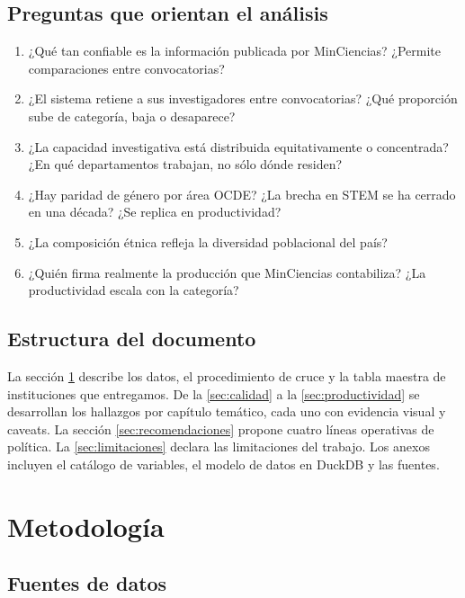 \documentclass[11pt,a4paper,oneside]{article}
\begin{document}
\subsection{Preguntas que orientan el análisis}

\begin{enumerate}[label=Q\arabic*., leftmargin=*]
\item ¿Qué tan confiable es la información publicada por MinCiencias? ¿Permite comparaciones entre convocatorias?
\item ¿El sistema retiene a sus investigadores entre convocatorias? ¿Qué proporción sube de categoría, baja o desaparece?
\item ¿La capacidad investigativa está distribuida equitativamente o concentrada? ¿En qué departamentos trabajan, no sólo dónde residen?
\item ¿Hay paridad de género por área OCDE? ¿La brecha en STEM se ha cerrado en una década? ¿Se replica en productividad?
\item ¿La composición étnica refleja la diversidad poblacional del país?
\item ¿Quién firma realmente la producción que MinCiencias contabiliza? ¿La productividad escala con la categoría?
\end{enumerate}

\subsection{Estructura del documento}

La sección \ref{sec:metodo} describe los datos, el procedimiento de cruce y la tabla maestra de instituciones que entregamos. De la \ref{sec:calidad} a la \ref{sec:productividad} se desarrollan los hallazgos por capítulo temático, cada uno con evidencia visual y caveats. La sección \ref{sec:recomendaciones} propone cuatro líneas operativas de política. La \ref{sec:limitaciones} declara las limitaciones del trabajo. Los anexos incluyen el catálogo de variables, el modelo de datos en DuckDB y las fuentes.

\section{Metodología}\label{sec:metodo}

\subsection{Fuentes de datos}
\end{document}
